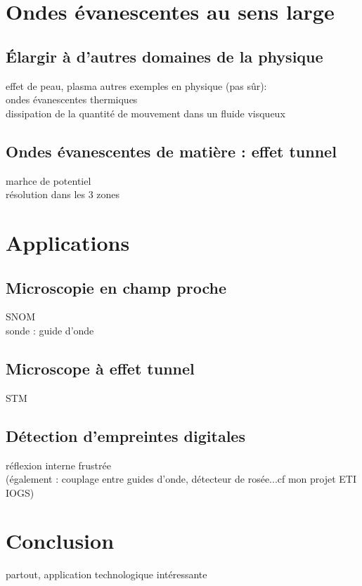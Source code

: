 \section{Ondes évanescentes au sens large}
\subsection{Élargir à d'autres domaines de la physique}
effet de peau, plasma
autres exemples en physique (pas sûr):  \\
ondes évanescentes thermiques \\
dissipation de la quantité de mouvement dans un fluide visqueux \\
\subsection{Ondes évanescentes de matière : effet tunnel}
marhce de potentiel \\
résolution dans les 3 zones \\
\section{Applications}
\subsection{Microscopie en champ proche}
SNOM \\
sonde : guide d'onde \\
\subsection{Microscope à effet tunnel}
STM \\
\subsection{Détection d'empreintes digitales}
réflexion interne frustrée \\
(également : couplage entre guides d'onde, détecteur de rosée...cf mon projet ETI IOGS)


\section*{Conclusion}
partout, application technologique intéressante

